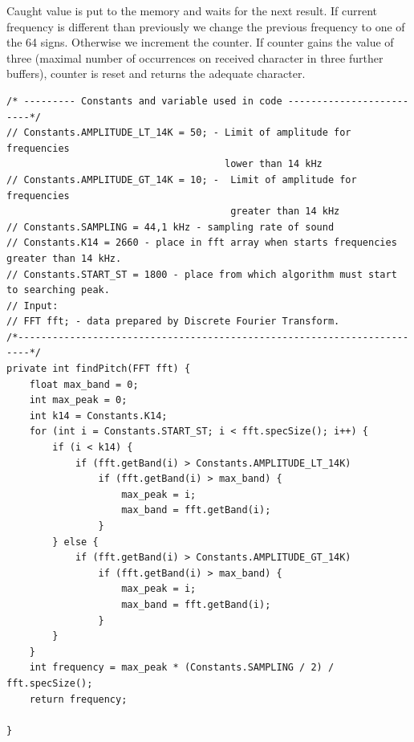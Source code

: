 \documentclass[11pt,titlepage]{article}
\theoremstyle{plain}
\begin{document}
Caught value is put to the memory and waits for the next result. If current frequency is different than previously we change the previous frequency to one of the 64 signs. Otherwise we increment the counter. If counter gains the value of three (maximal number of occurrences on received character in three further buffers), counter is reset and returns the adequate character.
\begin{minipage}{\linewidth}
\begin{lstlisting}
/* --------- Constants and variable used in code -------------------------*/
// Constants.AMPLITUDE_LT_14K = 50; - Limit of amplitude for frequencies
							          lower than 14 kHz		   
// Constants.AMPLITUDE_GT_14K = 10; -  Limit of amplitude for frequencies
									   greater than 14 kHz	
// Constants.SAMPLING = 44,1 kHz - sampling rate of sound
// Constants.K14 = 2660 - place in fft array when starts frequencies greater than 14 kHz.
// Constants.START_ST = 1800 - place from which algorithm must start to searching peak.
// Input:																   
// FFT fft; - data prepared by Discrete Fourier Transform.  
/*------------------------------------------------------------------------*/
private int findPitch(FFT fft) {
	float max_band = 0;
	int max_peak = 0;
	int k14 = Constants.K14;
	for (int i = Constants.START_ST; i < fft.specSize(); i++) {
		if (i < k14) {
			if (fft.getBand(i) > Constants.AMPLITUDE_LT_14K)
				if (fft.getBand(i) > max_band) {
					max_peak = i;
					max_band = fft.getBand(i);
				}
		} else {
			if (fft.getBand(i) > Constants.AMPLITUDE_GT_14K)
				if (fft.getBand(i) > max_band) {
					max_peak = i;
					max_band = fft.getBand(i);
				}
		}
	}
	int frequency = max_peak * (Constants.SAMPLING / 2) / fft.specSize();
	return frequency;

}
\end{lstlisting}
\end{minipage}
\end{document}
